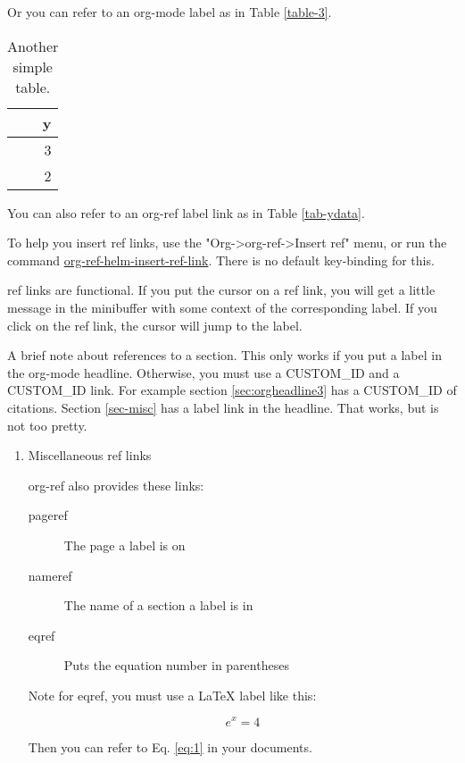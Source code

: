 \documentclass[11pt]{article}
\begin{document}
Or you can refer to an org-mode label as in Table \ref{table-3}.

\begin{table}[htb]
\caption{\label{tab:orgtable2}
Another simple table.}
\centering
\begin{tabular}{r}
y\\
\hline
3\\
2\\
\end{tabular}
\end{table}

You can also refer to an org-ref label link as in Table \ref{tab-ydata}.

To help you insert ref links, use the "Org->org-ref->Insert ref" menu, or run the command \url{org-ref-helm-insert-ref-link}. There is no default key-binding for this.

ref links are functional. If you put the cursor on a ref link, you will get a little message in the minibuffer with some context of the corresponding label. If you click on the ref link, the cursor will jump to the label.

A brief note about references to a section. This only works if you put a label in the org-mode headline. Otherwise, you must use a CUSTOM\_ID and a CUSTOM\_ID link. For example section \ref{sec:orgheadline3} has a CUSTOM\_ID of citations. Section \ref{sec-misc} has a label link in the headline. That works, but is not too pretty.

\begin{enumerate}
\item Miscellaneous ref links  \label{sec-misc}
\label{sec:orgheadline5}
  

org-ref also provides these links:

\begin{description}
\item[{pageref}] The page a label is on
\item[{nameref}] The name of a section a label is in
\item[{eqref}] Puts the equation number in parentheses
\end{description}

Note for eqref, you must use a \LaTeX{} label like this:

\begin{equation}
e^x = 4 \label{eq:1}
\end{equation}

Then you can refer to Eq. \eqref{eq:1} in your documents.
\end{enumerate}
\end{document}
